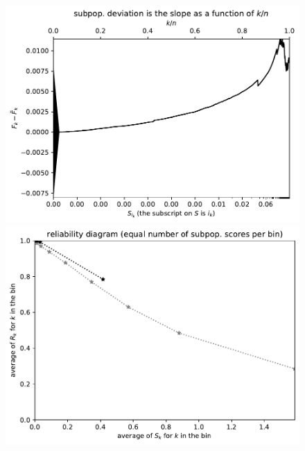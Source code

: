 \documentclass{article}
\begin{document}
\begin{figure}
\begin{centering}

\parbox{\imsize}{\includegraphics[width=\imsize]
{./codes/unweighted/nll-1-323-monarch-monarch-butterfly-milkweed-butterfly-Danaus-plexippus}}
\quad\quad
\parbox{\imsize}{\includegraphics[width=\imsize]
{./codes/unweighted/nll-1-323-monarch-monarch-butterfly-milkweed-butterfly-Danaus-plexippusequisamps10}}

\vspace{\vertsep}


\end{centering}
\end{figure}
\end{document}
